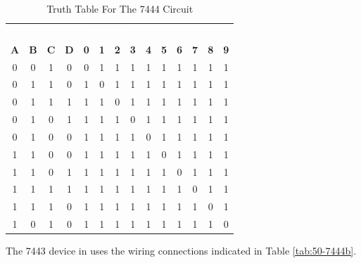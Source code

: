 \begin{table}[H]
	\sffamily
	\newcommand{\head}[1]{\textcolor{white}{\textbf{#1}}}		
	\begin{center}
		\begin{tabular}{cccc | cccccccccc} 
			\rowcolor{black!75}
			\multicolumn{4}{c}{\head{Inputs}} & \multicolumn{10}{c}{\head{Output}} \\
			\textbf{A} & \textbf{B} & \textbf{C} & \textbf{D} & \textbf{0} & \textbf{1} & \textbf{2} & \textbf{3} & \textbf{4} & \textbf{5} & \textbf{6} & \textbf{7} & \textbf{8} & \textbf{9} \\
			\hline
			0 & 0 & 1 & 0  & 0 & 1 & 1 & 1 & 1 & 1 & 1 & 1 & 1 & 1 \\
			0 & 1 & 1 & 0  & 1 & 0 & 1 & 1 & 1 & 1 & 1 & 1 & 1 & 1 \\
			0 & 1 & 1 & 1  & 1 & 1 & 0 & 1 & 1 & 1 & 1 & 1 & 1 & 1 \\
			0 & 1 & 0 & 1  & 1 & 1 & 1 & 0 & 1 & 1 & 1 & 1 & 1 & 1 \\
			0 & 1 & 0 & 0  & 1 & 1 & 1 & 1 & 0 & 1 & 1 & 1 & 1 & 1 \\
			1 & 1 & 0 & 0  & 1 & 1 & 1 & 1 & 1 & 0 & 1 & 1 & 1 & 1 \\
			1 & 1 & 0 & 1  & 1 & 1 & 1 & 1 & 1 & 1 & 0 & 1 & 1 & 1 \\
			1 & 1 & 1 & 1  & 1 & 1 & 1 & 1 & 1 & 1 & 1 & 0 & 1 & 1 \\
			1 & 1 & 1 & 0  & 1 & 1 & 1 & 1 & 1 & 1 & 1 & 1 & 0 & 1 \\
			1 & 0 & 1 & 0  & 1 & 1 & 1 & 1 & 1 & 1 & 1 & 1 & 1 & 0 \\
		\end{tabular}
	\end{center}
	\caption{Truth Table For The 7444 Circuit}
	\label{tab:50-7444a}
\end{table}

The 7443 device in \LE uses the wiring connections indicated in Table \ref{tab:50-7444b}.

